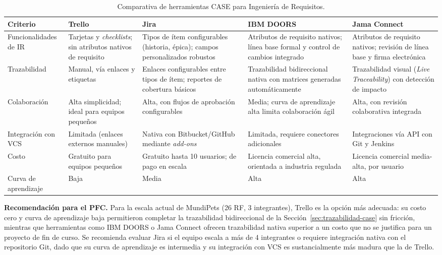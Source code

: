 \documentclass[journal,onecolumn]{IEEEtran}
\begin{document}
	\begin{table}[H]
		\centering
		\caption{Comparativa de herramientas CASE para Ingeniería de Requisitos.}
		\label{tab:comparativa-case}
		\small
		\begin{tabularx}{\textwidth}{@{}l X X X X@{}}
			\toprule
			\textbf{Criterio} & \textbf{Trello} & \textbf{Jira} & \textbf{IBM DOORS} & \textbf{Jama Connect} \\
			\midrule
			Funcionalidades de IR & Tarjetas y \emph{checklists}; sin atributos nativos de requisito & Tipos de ítem configurables (historia, épica); campos personalizados robustos & Atributos de requisito nativos; línea base formal y control de cambios integrado & Atributos de requisito nativos; revisión de línea base y firma electrónica \\
			\addlinespace
			Trazabilidad & Manual, vía enlaces y etiquetas & Enlaces configurables entre tipos de ítem; reportes de cobertura básicos & Trazabilidad bidireccional nativa con matrices generadas automáticamente & Trazabilidad visual (\emph{Live Traceability}) con detección de impacto \\
			\addlinespace
			Colaboración & Alta simplicidad; ideal para equipos pequeños & Alta, con flujos de aprobación configurables & Media; curva de aprendizaje alta limita colaboración ágil & Alta, con revisión colaborativa integrada \\
			\addlinespace
			Integración con VCS & Limitada (enlaces externos manuales) & Nativa con Bitbucket/GitHub mediante \emph{add-ons} & Limitada, requiere conectores adicionales & Integraciones vía API con Git y Jenkins \\
			\addlinespace
			Costo & Gratuito para equipos pequeños & Gratuito hasta 10 usuarios; de pago en escala & Licencia comercial alta, orientada a industria regulada & Licencia comercial media-alta, por usuario \\
			\addlinespace
			Curva de aprendizaje & Baja & Media & Alta & Alta \\
			\bottomrule
		\end{tabularx}
	\end{table}
	
	\textbf{Recomendación para el PFC.} Para la escala actual de
	MundiPets (26 RF, 3 integrantes), Trello es la opción más
	adecuada: su costo cero y curva de aprendizaje baja permitieron
	completar la trazabilidad bidireccional de la
	Sección~\ref{sec:trazabilidad-case} sin fricción, mientras que
	herramientas como IBM DOORS o Jama Connect ofrecen trazabilidad
	nativa superior a un costo que no se justifica para un proyecto de
	fin de curso. Se recomienda evaluar Jira si el equipo escala a más
	de 4 integrantes o requiere integración nativa con el repositorio
	Git, dado que su curva de aprendizaje es intermedia y su
	integración con VCS es sustancialmente más madura que la de
	Trello.
	
\end{document}
